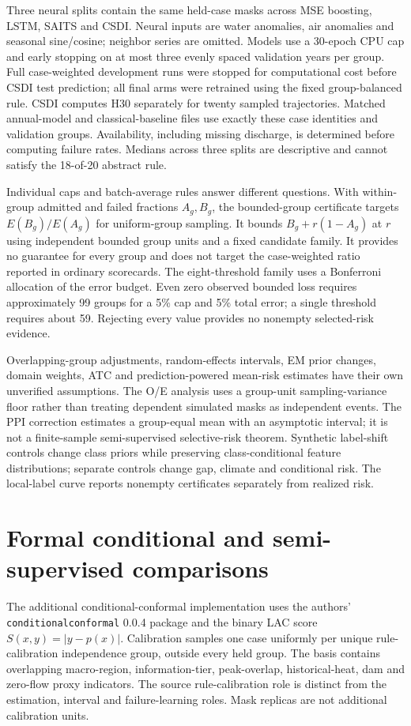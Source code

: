 \documentclass[draft]{agujournal2025}
\begin{document}
Three neural splits contain the same held-case masks across MSE boosting, LSTM, SAITS and CSDI. Neural inputs are water anomalies, air anomalies and seasonal sine/cosine; neighbor series are omitted. Models use a 30-epoch CPU cap and early stopping on at most three evenly spaced validation years per group. Full case-weighted development runs were stopped for computational cost before CSDI test prediction; all final arms were retrained using the fixed group-balanced rule. CSDI computes H30 separately for twenty sampled trajectories. Matched annual-model and classical-baseline files use exactly these case identities and validation groups. Availability, including missing discharge, is determined before computing failure rates. Medians across three splits are descriptive and cannot satisfy the 18-of-20 abstract rule.

Individual caps and batch-average rules answer different questions. With within-group admitted and failed fractions $A_g,B_g$, the bounded-group certificate targets $E(B_g)/E(A_g)$ for uniform-group sampling. It bounds $B_g+r(1-A_g)$ at $r$ using independent bounded group units and a fixed candidate family. It provides no guarantee for every group and does not target the case-weighted ratio reported in ordinary scorecards. The eight-threshold family uses a Bonferroni allocation of the error budget. Even zero observed bounded loss requires approximately 99 groups for a 5\% cap and 5\% total error; a single threshold requires about 59. Rejecting every value provides no nonempty selected-risk evidence.

Overlapping-group adjustments, random-effects intervals, EM prior changes, domain weights, ATC and prediction-powered mean-risk estimates have their own unverified assumptions. The O/E analysis uses a group-unit sampling-variance floor rather than treating dependent simulated masks as independent events. The PPI correction estimates a group-equal mean with an asymptotic interval; it is not a finite-sample semi-supervised selective-risk theorem. Synthetic label-shift controls change class priors while preserving class-conditional feature distributions; separate controls change gap, climate and conditional risk. The local-label curve reports nonempty certificates separately from realized risk.

\section{Formal conditional and semi-supervised comparisons}
The additional conditional-conformal implementation uses the authors' \texttt{conditionalconformal} 0.0.4 package and the binary LAC score $S(x,y)=|y-p(x)|$. Calibration samples one case uniformly per unique rule-calibration independence group, outside every held group. The basis contains overlapping macro-region, information-tier, peak-overlap, historical-heat, dam and zero-flow proxy indicators. The source rule-calibration role is distinct from the estimation, interval and failure-learning roles. Mask replicas are not additional calibration units.
\end{document}
